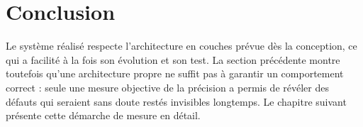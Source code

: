 \section{Conclusion}

Le système réalisé respecte l'architecture en couches prévue dès la conception, ce qui a facilité à la fois son évolution et son test. La section précédente montre toutefois qu'une architecture propre ne suffit pas à garantir un comportement correct : seule une mesure objective de la précision a permis de révéler des défauts qui seraient sans doute restés invisibles longtemps. Le chapitre suivant présente cette démarche de mesure en détail.
